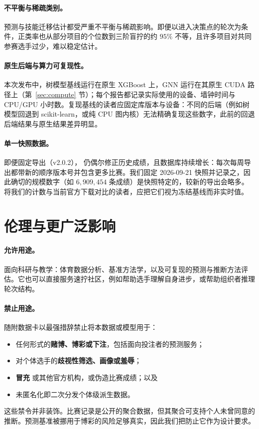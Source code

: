 \paragraph{不平衡与稀疏类别。}\DNF{} 预测与技能迁移估计都受严重不平衡与稀疏影响。即便以进入决策点的轮次为条件，正类率也从部分项目的个位数到三阶盲拧的约 $95\%$ 不等，且许多项目对共同参赛选手过少，难以稳定估计。

\paragraph{原生后端与算力可复现性。}本次发布中，树模型基线运行在原生 XGBoost 上，GNN 运行在其原生 CUDA 路径上（第~\ref{sec:compute} 节）；每个报告都记录实际使用的设备、墙钟时间与 CPU/GPU 小时数。复现基线的读者应固定库版本与设备：不同的后端（例如树模型回退到 scikit-learn，或纯 CPU 图内核）无法精确复现这些数字，此前的回退后端结果与原生结果差异明显。

\paragraph{单一快照数据。}即便固定导出（v2.0.2），\wca{} 仍偶尔修正历史成绩，且数据库持续增长：每次每周导出都带新的顺序版本号并包含更多比赛。我们固定 2026-09-21 快照并记录之，因此确切的规模数字（如 $6{,}909{,}454$ 条成绩）是快照特定的，较新的导出会略多。将我们的计数与当前官方下载对比的读者，应把它们视为冻结基线而非实时值。

\section{伦理与更广泛影响}
\label{sec:ethics}

\paragraph{允许用途。}\wcabench{} 面向科研与教学：体育数据分析、基准方法学，以及可复现的预测与推断方法评估。它也可以直接服务速拧社区，例如帮助选手理解自身进步，或帮助组织者推理轮次结构。

\paragraph{禁止用途。}随附数据卡以最强措辞禁止将本数据或模型用于：
\begin{itemize}
  \item 任何形式的\textbf{赌博、博彩或下注}，包括面向投注者的预测服务；
  \item 对个体选手的\textbf{歧视性筛选、画像或羞辱}；
  \item \textbf{冒充} \wca{} 或其他官方机构，或伪造比赛成绩；以及
  \item 未匿名化即二次分发个体级派生数据。
\end{itemize}
这些禁令并非装饰。比赛记录是公开的聚合数据，但其聚合可支持个人未曾同意的推断。预测基准被挪用于博彩的风险足够真实，因此我们把防止它作为设计要求。

